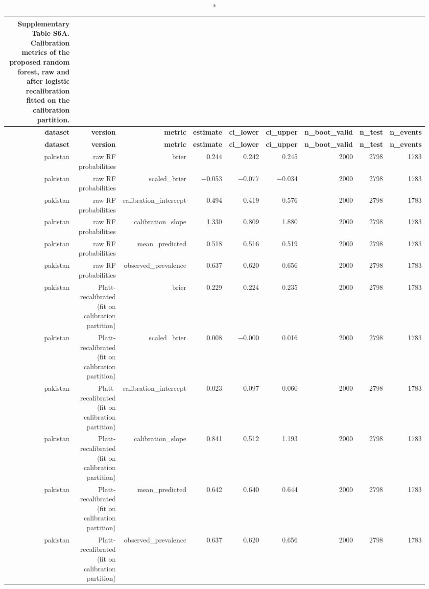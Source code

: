 \documentclass[10pt]{article}
\begin{document}
\normalsize

\tiny
\setlength{\tabcolsep}{2pt}
\begin{longtable}{rrrrrrrrr}
\caption*{\textbf{Supplementary Table S6A.} Calibration metrics of the proposed random forest, raw and after logistic recalibration fitted on the calibration partition.}\\
\toprule
\textbf{dataset} & \textbf{version} & \textbf{metric} & \textbf{estimate} & \textbf{ci\_lower} & \textbf{ci\_upper} & \textbf{n\_boot\_valid} & \textbf{n\_test} & \textbf{n\_events} \\
\midrule
\endfirsthead
\toprule
\textbf{dataset} & \textbf{version} & \textbf{metric} & \textbf{estimate} & \textbf{ci\_lower} & \textbf{ci\_upper} & \textbf{n\_boot\_valid} & \textbf{n\_test} & \textbf{n\_events} \\
\midrule
\endhead
\bottomrule
\endfoot
pakistan & raw RF probabilities & brier & 0.244 & 0.242 & 0.245 & 2000 & 2798 & 1783 \\
pakistan & raw RF probabilities & scaled\_brier & $-$0.053 & $-$0.077 & $-$0.034 & 2000 & 2798 & 1783 \\
pakistan & raw RF probabilities & calibration\_intercept & 0.494 & 0.419 & 0.576 & 2000 & 2798 & 1783 \\
pakistan & raw RF probabilities & calibration\_slope & 1.330 & 0.809 & 1.880 & 2000 & 2798 & 1783 \\
pakistan & raw RF probabilities & mean\_predicted & 0.518 & 0.516 & 0.519 & 2000 & 2798 & 1783 \\
pakistan & raw RF probabilities & observed\_prevalence & 0.637 & 0.620 & 0.656 & 2000 & 2798 & 1783 \\
pakistan & Platt-recalibrated (fit on calibration partition) & brier & 0.229 & 0.224 & 0.235 & 2000 & 2798 & 1783 \\
pakistan & Platt-recalibrated (fit on calibration partition) & scaled\_brier & 0.008 & $-$0.000 & 0.016 & 2000 & 2798 & 1783 \\
pakistan & Platt-recalibrated (fit on calibration partition) & calibration\_intercept & $-$0.023 & $-$0.097 & 0.060 & 2000 & 2798 & 1783 \\
pakistan & Platt-recalibrated (fit on calibration partition) & calibration\_slope & 0.841 & 0.512 & 1.193 & 2000 & 2798 & 1783 \\
pakistan & Platt-recalibrated (fit on calibration partition) & mean\_predicted & 0.642 & 0.640 & 0.644 & 2000 & 2798 & 1783 \\
pakistan & Platt-recalibrated (fit on calibration partition) & observed\_prevalence & 0.637 & 0.620 & 0.656 & 2000 & 2798 & 1783 \\

\end{longtable}
\end{document}
